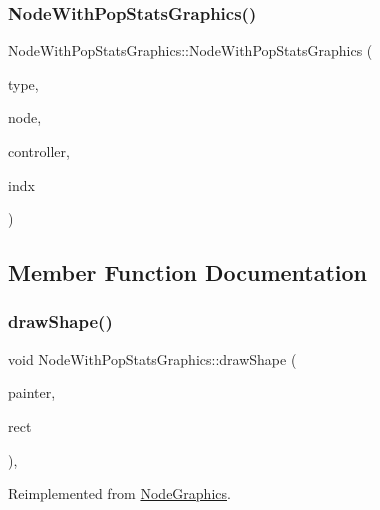\subsubsection{\texorpdfstring{NodeWithPopStatsGraphics()}{NodeWithPopStatsGraphics()}}
{\footnotesize\ttfamily Node\+With\+Pop\+Stats\+Graphics\+::\+Node\+With\+Pop\+Stats\+Graphics (\begin{DoxyParamCaption}\item[{\mbox{\hyperlink{class_node_with_pop_stats_graphics_aeaa9e3e8bdb1f52ee13c0516413d33fe}{Type}}}]{type,  }\item[{\mbox{\hyperlink{class_node_data}{Node\+Data}} $\ast$}]{node,  }\item[{\mbox{\hyperlink{class_map_objects_controller}{Map\+Objects\+Controller}} $\ast$}]{controller,  }\item[{int}]{indx }\end{DoxyParamCaption})\hspace{0.3cm}{\ttfamily [inline]}}



\subsection{Member Function Documentation}
\mbox{\label{class_node_with_pop_stats_graphics_aa492c90c2a9d8b3b9d741431d8701a86}} 
\subsubsection{\texorpdfstring{drawShape()}{drawShape()}}
{\footnotesize\ttfamily void Node\+With\+Pop\+Stats\+Graphics\+::draw\+Shape (\begin{DoxyParamCaption}\item[{Q\+Painter \&}]{painter,  }\item[{const qmapcontrol\+::\+Rect\+World\+Px \&}]{rect }\end{DoxyParamCaption})\hspace{0.3cm}{\ttfamily [protected]}, {\ttfamily [virtual]}}



Reimplemented from \mbox{\hyperlink{class_node_graphics_a6befa2f5ffc0c7efb4e56bc0c0aeff96}{Node\+Graphics}}.

\mbox{\label{class_node_with_pop_stats_graphics_ab3143ecda45d6e2e05022c25b0129611}} 
